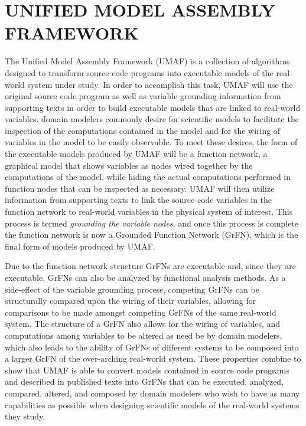 \chapter{UNIFIED MODEL ASSEMBLY FRAMEWORK\label{chapter:umaf}}
The Unified Model Assembly Framework (UMAF) is a collection of algorithms designed to transform source code programs into executable models of the real-world system under study.
In order to accomplish this task, UMAF will use the original source code program as well as variable grounding information from supporting texts in order to build executable models that are linked to real-world variables.
domain modelers commonly desire for scientific models to facilitate the inspection of the computations contained in the model and for the wiring of variables in the model to be easily observable.
To meet these desires, the form of the executable models produced by UMAF will be a function network, a graphical model that shows variables as nodes wired together by the computations of the model, while hiding the actual computations performed in function nodes that can be inspected as necessary.
UMAF will then utilize information from supporting texts to link the source code variables in the function network to real-world variables in the physical system of interest.
This process is termed \textit{grounding the variable nodes}, and once this process is complete the function network is now a Grounded Function Network (GrFN), which is the final form of models produced by UMAF.

Due to the function network structure GrFNs are executable and, since they are executable, GrFNs can also be analyzed by functional analysis methods.
As a side-effect of the variable grounding process, competing GrFNs can be structurally compared upon the wiring of their variables, allowing for comparisons to be made amongst competing GrFNs of the same real-world system.
The structure of a GrFN also allows for the wiring of variables, and computations among variables to be altered as need be by domain modelers, which also leads to the ability of GrFNs of different systems to be composed into a larger GrFN of the over-arching real-world system.
These properties combine to show that UMAF is able to convert models contained in source code programs and described in published texts into GrFNs that can be executed, analyzed, compared, altered, and composed by domain modelers who wish to have as many capabilities as possible when designing scientific models of the real-world systems they study.

